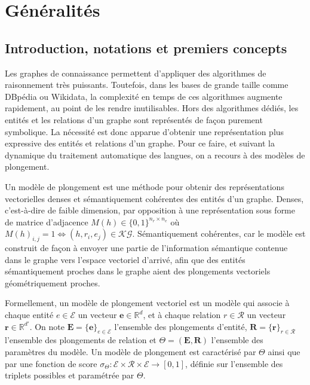 \label{chap:kge}

\section{Généralités}
\label{sec:kge-general}

\subsection{Introduction, notations et premiers concepts}
\label{subsec:kge-general-intro}

Les graphes de connaissance permettent d'appliquer des algorithmes de raisonnement très puissants. Toutefois, dans les bases de grande taille comme DBpédia ou Wikidata, la complexité en temps de ces algorithmes augmente rapidement, au point de les rendre inutilisables. Hors des algorithmes dédiés, les entités et les relations d'un graphe sont représentés de façon purement symbolique. La nécessité est donc apparue d'obtenir une représentation plus expressive des entités et relations d'un graphe. Pour ce faire, et suivant la dynamique du traitement automatique des langues, on a recours à des modèles de plongement. 


Un modèle de plongement est une méthode pour obtenir des représentations vectorielles denses et sémantiquement cohérentes des entités d'un graphe. Denses, c'est-à-dire de faible dimension, par opposition à une représentation sous forme de matrice d'adjacence $M(h) \in \{0, 1\}^{n_r \times n_e}$ où $M(h)_{i, j} = 1 \iff (h, r_i, e_j) \in \mathcal{KG}$. Sémantiquement cohérentes, car le modèle est construit de façon à envoyer une partie de l'information sémantique contenue dans le graphe vers l'espace vectoriel d'arrivé, afin que des entités sémantiquement proches dans le graphe aient des plongements vectoriels géométriquement proches.

Formellement, un modèle de plongement vectoriel est un modèle qui associe à chaque entité $e \in \mathcal{E}$ un vecteur $\mathbf{e} \in \mathbb{R}^d$, et à chaque relation $r \in \mathcal{R}$ un vecteur $\mathbf{r} \in \mathbb{R}^{d'}$. On note $\mathbf{E} = \{\mathbf{e}\}_{e \in \mathcal{E}} $ l'ensemble des plongements d'entité, $\mathbf{R} = \{\mathbf{r}\}_{r \in \mathcal{R}} $ l'ensemble des plongements de relation et $\Theta = (\mathbf{E}, \mathbf{R})$ l'ensemble des paramètres du modèle. Un modèle de plongement est caractérisé par $\Theta$ ainsi que par une fonction de score $\sigma_{\Theta} : \mathcal{E \times R \times E} \rightarrow [0, 1]$, définie sur l'ensemble des triplets possibles et paramétrée par $\Theta$.  

